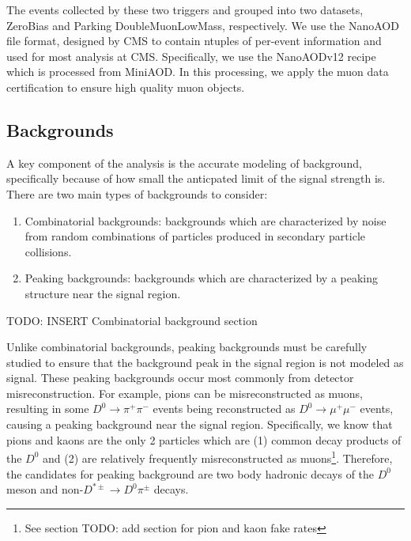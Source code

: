 The events collected by these two triggers and grouped into two datasets, ZeroBias and Parking DoubleMuonLowMass, respectively. We use the NanoAOD file format, designed by CMS to contain ntuples of per-event information and used for most analysis at CMS. Specifically, we use the NanoAODv12 recipe which is processed from MiniAOD. In this processing, we apply the muon data certification to ensure high quality muon objects. 

\subsection{Backgrounds}

A key component of the analysis is the accurate modeling of background, specifically because of how small the anticpated limit of the signal strength is. There are two main types of backgrounds to consider: 
\begin{enumerate}
    \item Combinatorial backgrounds: backgrounds which are characterized by noise from random combinations of particles produced in secondary particle collisions. 
    \item Peaking backgrounds: backgrounds which are characterized by a peaking structure near the signal region.
\end{enumerate}

TODO: INSERT Combinatorial background section

Unlike combinatorial backgrounds, peaking backgrounds must be carefully studied to ensure that the background peak in the signal region is not modeled as signal. These peaking backgrounds occur most commonly from detector misreconstruction. For example, pions can be misreconstructed as muons, resulting in some $D^0 \to \pi^+ \pi^-$ events being reconstructed as $D^0 \to \mu^+ \mu^-$ events, causing a peaking background near the signal region. Specifically, we know that pions and kaons are the only 2 particles which are (1) common decay products of the $D^0$ and (2) are relatively frequently misreconstructed as muons\footnote{See section TODO: add section for pion and kaon fake rates}. Therefore, the candidates for peaking background are two body hadronic decays of the $D^0$ meson and non-$D^{*\pm} \to D^0 \pi^\pm$ decays. 

